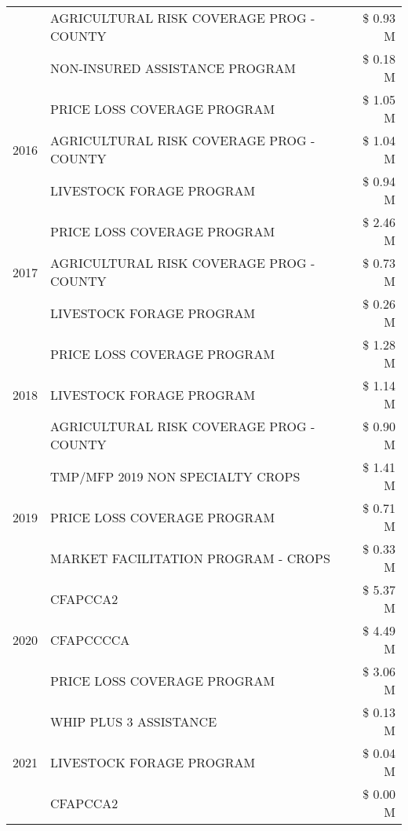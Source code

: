 \begin{tabular}{llr}
 & AGRICULTURAL RISK COVERAGE PROG - COUNTY & \$ 0.93 M \\
 & NON-INSURED ASSISTANCE PROGRAM & \$ 0.18 M \\
\cline{1-3}
\multirow[t]{3}{*}{2016} & PRICE LOSS COVERAGE PROGRAM & \$ 1.05 M \\
 & AGRICULTURAL RISK COVERAGE PROG - COUNTY & \$ 1.04 M \\
 & LIVESTOCK FORAGE PROGRAM & \$ 0.94 M \\
\cline{1-3}
\multirow[t]{3}{*}{2017} & PRICE LOSS COVERAGE PROGRAM & \$ 2.46 M \\
 & AGRICULTURAL RISK COVERAGE PROG - COUNTY & \$ 0.73 M \\
 & LIVESTOCK FORAGE PROGRAM & \$ 0.26 M \\
\cline{1-3}
\multirow[t]{3}{*}{2018} & PRICE LOSS COVERAGE PROGRAM & \$ 1.28 M \\
 & LIVESTOCK FORAGE PROGRAM & \$ 1.14 M \\
 & AGRICULTURAL RISK COVERAGE PROG - COUNTY & \$ 0.90 M \\
\cline{1-3}
\multirow[t]{3}{*}{2019} & TMP/MFP 2019 NON SPECIALTY CROPS & \$ 1.41 M \\
 & PRICE LOSS COVERAGE PROGRAM & \$ 0.71 M \\
 & MARKET FACILITATION PROGRAM - CROPS & \$ 0.33 M \\
\cline{1-3}
\multirow[t]{3}{*}{2020} & CFAPCCA2 & \$ 5.37 M \\
 & CFAPCCCCA & \$ 4.49 M \\
 & PRICE LOSS COVERAGE PROGRAM & \$ 3.06 M \\
\cline{1-3}
\multirow[t]{3}{*}{2021} & WHIP PLUS 3 ASSISTANCE & \$ 0.13 M \\
 & LIVESTOCK FORAGE PROGRAM & \$ 0.04 M \\
 & CFAPCCA2 & \$ 0.00 M \\
\cline{1-3}
\bottomrule
\end{tabular}
